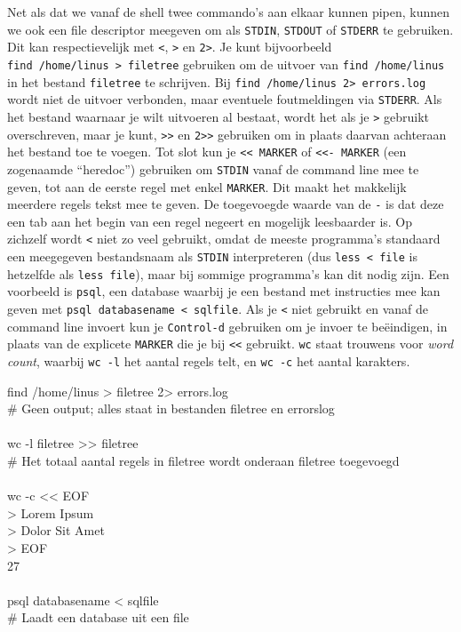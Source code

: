 Net als dat we vanaf de shell twee commando's aan elkaar kunnen pipen, kunnen we ook een file descriptor meegeven om als \texttt{STDIN}, \texttt{STDOUT} of \texttt{STDERR} te gebruiken. Dit kan respectievelijk met \texttt{\textless{}}, \texttt{\textgreater{}} en \texttt{2\textgreater{}}. Je kunt bijvoorbeeld \texttt{find\ /home/linus\ \textgreater{}\ filetree} gebruiken om de uitvoer van \texttt{find\ /home/linus} in het bestand \texttt{filetree} te schrijven. Bij \texttt{find\ /home/linus\ 2\textgreater{}\ errors.log} wordt niet de uitvoer verbonden, maar eventuele foutmeldingen via \texttt{STDERR}. Als het bestand waarnaar je wilt uitvoeren al bestaat, wordt het als je \texttt{\textgreater{}} gebruikt overschreven, maar je kunt, \texttt{\textgreater{}\textgreater{}} en \texttt{2\textgreater{}\textgreater{}} gebruiken om in plaats daarvan achteraan het bestand toe te voegen. Tot slot kun je \texttt{\textless{}\textless{}\ MARKER} of \texttt{\textless{}\textless{}-\ MARKER} (een zogenaamde ``heredoc'') gebruiken om \texttt{STDIN} vanaf de command line mee te geven, tot aan de eerste regel met enkel \texttt{MARKER}. Dit maakt het makkelijk meerdere regels tekst mee te geven. De toegevoegde waarde van de \texttt{-} is dat deze een tab aan het begin van een regel negeert en mogelijk leesbaarder is. Op zichzelf wordt \texttt{\textless{}} niet zo veel gebruikt, omdat de meeste programma's standaard een meegegeven bestandsnaam als \texttt{STDIN} interpreteren (dus \texttt{less\ \textless{}\ file} is hetzelfde als \texttt{less\ file}), maar bij sommige programma's kan dit nodig zijn. Een voorbeeld is \texttt{psql}, een database waarbij je een bestand met instructies mee kan geven met \texttt{psql\ databasename\ \textless{}\ sqlfile}. Als je \texttt{\textless{}} niet gebruikt en vanaf de command line invoert kun je \texttt{Control-d} gebruiken om je invoer te beëindigen, in plaats van de explicete \texttt{MARKER} die je bij \texttt{\textless{}\textless{}} gebruikt. \texttt{wc} staat trouwens voor \emph{word count}, waarbij \texttt{wc\ -l} het aantal regels telt, en \texttt{wc\ -c} het aantal karakters.

\begin{bash}
\userprompt[~] find /home/linus > filetree 2> errors.log\\
\# Geen output; alles staat in bestanden filetree en errorslog\\
\\
\userprompt[~] wc -l filetree >\!> filetree\\
\# Het totaal aantal regels in filetree wordt onderaan filetree toegevoegd\\
\\
\userprompt[~] wc -c <\!< EOF\\
> Lorem Ipsum\\
> Dolor Sit Amet\\
> EOF\\
27\\
\\
\userprompt[~] psql databasename < sqlfile\\
\# Laadt een database uit een file\\
\end{bash}

